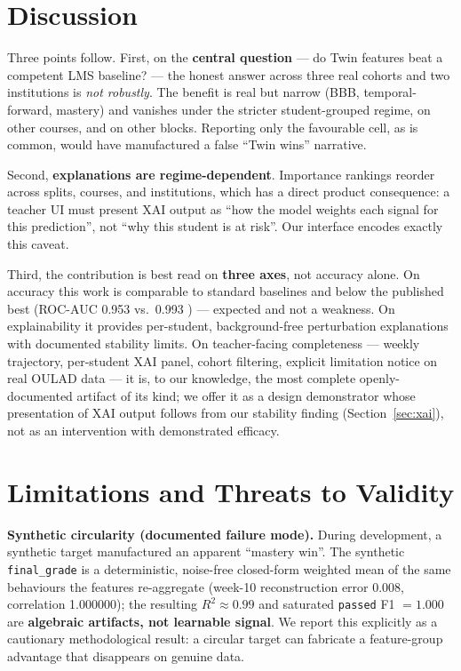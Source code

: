 \documentclass[conference]{IEEEtran}
\begin{document}
\section{Discussion}
Three points follow. First, on the \textbf{central question} --- do Twin features
beat a competent LMS baseline? --- the honest answer across three real cohorts
and two institutions is \emph{not robustly}. The benefit is real but narrow (BBB,
temporal-forward, mastery) and vanishes under the stricter student-grouped
regime, on other courses, and on other blocks. Reporting only the favourable
cell, as is common, would have manufactured a false ``Twin wins'' narrative.

Second, \textbf{explanations are regime-dependent}. Importance rankings reorder
across splits, courses, and institutions, which has a direct product consequence:
a teacher UI must present XAI output as ``how the model weights each signal for
this prediction'', not ``why this student is at risk''. Our interface encodes
exactly this caveat.

Third, the contribution is best read on \textbf{three axes}, not accuracy alone.
On accuracy this work is comparable to standard baselines and below the published
best (ROC-AUC 0.953 vs.\ 0.993 \cite{lopez2025}) --- expected and not a weakness.
On explainability it provides per-student, background-free perturbation
explanations with documented stability limits. On teacher-facing completeness ---
weekly trajectory, per-student XAI panel, cohort filtering, explicit limitation
notice on real OULAD data --- it is, to our knowledge, the most complete
openly-documented artifact of its kind; we offer it as a design demonstrator
whose presentation of XAI output follows from our stability finding
(Section~\ref{sec:xai}), not as an intervention with demonstrated efficacy.

\section{Limitations and Threats to Validity}
\label{sec:limitations}
\textbf{Synthetic circularity (documented failure mode).} During development, a
synthetic target manufactured an apparent ``mastery win''. The synthetic
\texttt{final\_grade} is a deterministic, noise-free closed-form weighted mean of
the same behaviours the features re-aggregate (week-10 reconstruction error
0.008, correlation 1.000000); the resulting $R^2 \approx 0.99$ and saturated
\texttt{passed} F1 $= 1.000$ are \textbf{algebraic artifacts, not learnable
signal}. We report this explicitly as a cautionary methodological result: a
circular target can fabricate a feature-group advantage that disappears on
genuine data.
\end{document}

